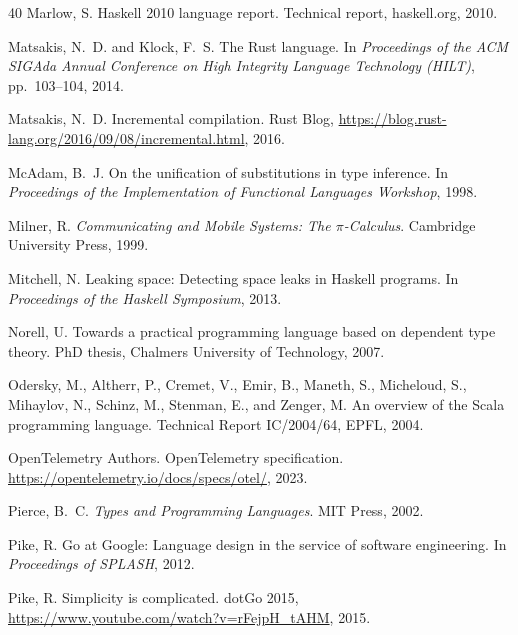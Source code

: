 \documentclass[11pt,twocolumn]{article}
\begin{document}
\begin{thebibliography}{40}
Marlow, S.
\newblock Haskell 2010 language report.
\newblock Technical report, haskell.org, 2010.

Matsakis, N.~D. and Klock, F.~S.
\newblock The Rust language.
\newblock In \emph{Proceedings of the ACM SIGAda Annual Conference on High Integrity Language Technology (HILT)}, pp.~103--104, 2014.

Matsakis, N.~D.
\newblock Incremental compilation.
\newblock Rust Blog, \url{https://blog.rust-lang.org/2016/09/08/incremental.html}, 2016.

McAdam, B.~J.
\newblock On the unification of substitutions in type inference.
\newblock In \emph{Proceedings of the Implementation of Functional Languages Workshop}, 1998.

Milner, R.
\newblock \emph{Communicating and Mobile Systems: The $\pi$-Calculus}.
\newblock Cambridge University Press, 1999.

Mitchell, N.
\newblock Leaking space: Detecting space leaks in Haskell programs.
\newblock In \emph{Proceedings of the Haskell Symposium}, 2013.

Norell, U.
\newblock Towards a practical programming language based on dependent type theory.
\newblock PhD thesis, Chalmers University of Technology, 2007.

Odersky, M., Altherr, P., Cremet, V., Emir, B., Maneth, S., Micheloud, S., Mihaylov, N., Schinz, M., Stenman, E., and Zenger, M.
\newblock An overview of the Scala programming language.
\newblock Technical Report IC/2004/64, EPFL, 2004.

OpenTelemetry Authors.
\newblock OpenTelemetry specification.
\newblock \url{https://opentelemetry.io/docs/specs/otel/}, 2023.

Pierce, B.~C.
\newblock \emph{Types and Programming Languages}.
\newblock MIT Press, 2002.

Pike, R.
\newblock Go at Google: Language design in the service of software engineering.
\newblock In \emph{Proceedings of SPLASH}, 2012.

Pike, R.
\newblock Simplicity is complicated.
\newblock dotGo 2015, \url{https://www.youtube.com/watch?v=rFejpH_tAHM}, 2015.


\end{thebibliography}
\end{document}
